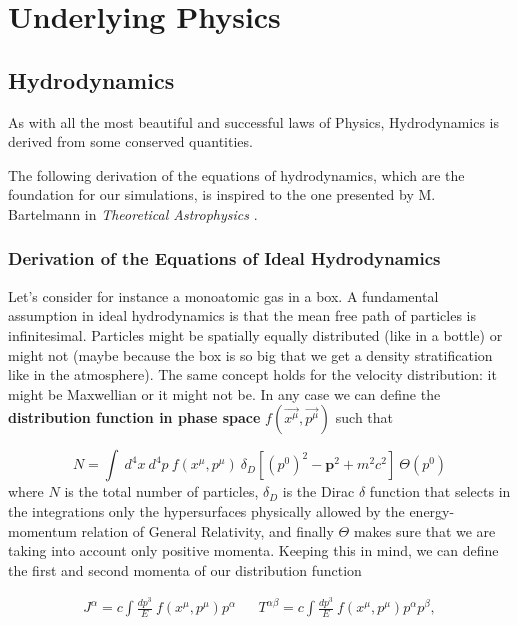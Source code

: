 
\chapter{Underlying Physics}
\section{Hydrodynamics}
As with all the most beautiful and successful laws of Physics, Hydrodynamics is derived from some conserved quantities. 

The following derivation of the equations of hydrodynamics, which are the foundation for our simulations, is inspired to the one presented by M. Bartelmann in \textit{Theoretical Astrophysics} \citet{theoastro}. 
\subsection{Derivation of the Equations of Ideal Hydrodynamics}

Let's consider for instance a monoatomic gas in a box. A fundamental assumption in ideal hydrodynamics is that the mean free path of particles is infinitesimal. Particles might be spatially equally distributed (like in a bottle) or might not (maybe because the box is so big that we get a density stratification like in the atmosphere). The same concept holds for the velocity distribution: it might be Maxwellian or it might not be. 
In any case we can define the \textbf{distribution function in phase space} $f( \vec{x^{\mu}}, \vec{p^{\mu}})$ such that

$$N=\int \ d^4x \ d^4p \ f( x^{\mu}, p^{\mu}) \  \delta_D[(p^0)^2-\mathbf{p}^2+m^2c^2] \  \Theta(p^0)$$ 
 where $N$ is the total number of particles, $\delta_D$ is the Dirac $\delta$ function that selects in the integrations only the hypersurfaces physically allowed by the energy-momentum relation of General Relativity, and finally $\Theta$ makes sure that we are taking into account only positive momenta. 
Keeping this in mind, we can define the first and second momenta of our distribution function

\begin{align}
J^{\alpha}= c \int \frac{dp^3}{E} \ f( x^{\mu}, p^{\mu}) p^{\alpha}  &&   T^{\alpha \beta}= c \int \frac{dp^3}{E} \ f( x^{\mu}, p^{\mu}) p^{\alpha}p^{\beta}, 
\end{align}
 
